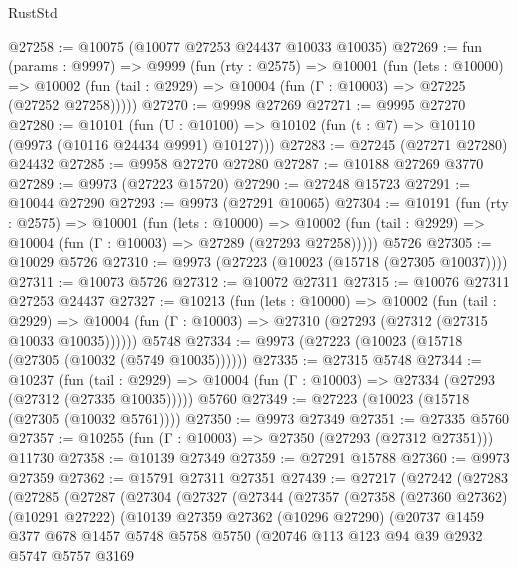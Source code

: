 \begin{lexlean}{RustStd}
\begin{coremodule}
@27258 := @10075 (@10077 @27253 @24437 @10033 @10035)
@27269 := fun (params : @9997) =>
  @9999
    (fun (rty : @2575) =>
    @10001
      (fun (lets : @10000) =>
      @10002 (fun (tail : @2929) => @10004 (fun (Γ : @10003) => @27225 (@27252 @27258)))))
@27270 := @9998 @27269
@27271 := @9995 @27270
@27280 := @10101
    (fun (U : @10100) => @10102 (fun (t : @7) => @10110 (@9973 (@10116 @24434 @9991) @10127)))
@27283 := @27245 (@27271 @27280) @24432
@27285 := @9958 @27270 @27280
@27287 := @10188 @27269 @3770
@27289 := @9973 (@27223 @15720)
@27290 := @27248 @15723
@27291 := @10044 @27290
@27293 := @9973 (@27291 @10065)
@27304 := @10191
    (fun (rty : @2575) =>
    @10001
      (fun (lets : @10000) =>
      @10002 (fun (tail : @2929) => @10004 (fun (Γ : @10003) => @27289 (@27293 @27258)))))
    @5726
@27305 := @10029 @5726
@27310 := @9973 (@27223 (@10023 (@15718 (@27305 @10037))))
@27311 := @10073 @5726
@27312 := @10072 @27311
@27315 := @10076 @27311 @27253 @24437
@27327 := @10213
    (fun (lets : @10000) =>
    @10002
      (fun (tail : @2929) =>
      @10004 (fun (Γ : @10003) => @27310 (@27293 (@27312 (@27315 @10033 @10035))))))
    @5748
@27334 := @9973 (@27223 (@10023 (@15718 (@27305 (@10032 (@5749 @10035))))))
@27335 := @27315 @5748
@27344 := @10237
    (fun (tail : @2929) => @10004 (fun (Γ : @10003) => @27334 (@27293 (@27312 (@27335 @10035)))))
    @5760
@27349 := @27223 (@10023 (@15718 (@27305 (@10032 @5761))))
@27350 := @9973 @27349
@27351 := @27335 @5760
@27357 := @10255 (fun (Γ : @10003) => @27350 (@27293 (@27312 @27351))) @11730
@27358 := @10139 @27349
@27359 := @27291 @15788
@27360 := @9973 @27359
@27362 := @15791 @27311 @27351
@27439 := @27217
    (@27242
      (@27283
        (@27285
          (@27287
            (@27304
              (@27327
                (@27344
                  (@27357
                    (@27358
                      (@27360 @27362)
                      (@10291 @27222)
                      (@10139
                        @27359
                        @27362
                        (@10296 @27290)
                        (@20737
                          @1459
                          @377
                          @678
                          @1457
                          @5748
                          @5758
                          @5750
                          (@20746
                            @113
                            @123
                            @94
                            @39
                            @2932
                            @5747
                            @5757
                            @3169

\end{coremodule}
\end{lexlean}
